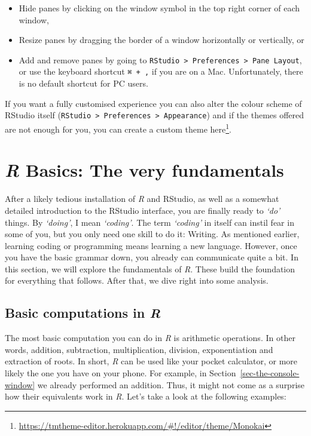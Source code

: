 \documentclass[
  letterpaper,
]{krantz}
\renewcommand{\href}[2]{#2\footnote{\url{#1}}}
\begin{document}
\begin{itemize}
\item
  Hide panes by clicking on the window symbol in the top right corner of
  each window,
\item
  Resize panes by dragging the border of a window horizontally or
  vertically, or
\item
  Add and remove panes by going to
  \texttt{RStudio\ \textgreater{}\ Preferences\ \textgreater{}\ Pane\ Layout},
  or use the keyboard shortcut \texttt{⌘\ +\ ,} if you are on a Mac.
  Unfortunately, there is no default shortcut for PC users.
\end{itemize}

If you want a fully customised experience you can also alter the colour
scheme of RStudio itself
(\texttt{RStudio\ \textgreater{}\ Preferences\ \textgreater{}\ Appearance})
and if the themes offered are not enough for you, you can create a
custom theme
\href{https://tmtheme-editor.herokuapp.com/\#!/editor/theme/Monokai}{here}.


\chapter{\texorpdfstring{\emph{R} Basics: The very
fundamentals}{R Basics: The very fundamentals}}\label{sec-r-basics-the-very-fundamentals}

After a likely tedious installation of \emph{R} and RStudio, as well as
a somewhat detailed introduction to the RStudio interface, you are
finally ready to \emph{`do'} things. By \emph{`doing'}, I mean
\emph{`coding'}. The term \emph{`coding'} in itself can instil fear in
some of you, but you only need one skill to do it: Writing. As mentioned
earlier, learning coding or programming means learning a new language.
However, once you have the basic grammar down, you already can
communicate quite a bit. In this section, we will explore the
fundamentals of \emph{R}. These build the foundation for everything that
follows. After that, we dive right into some analysis.

\section{\texorpdfstring{Basic computations in
\emph{R}}{Basic computations in R}}\label{sec-basic-computations-in-r}

The most basic computation you can do in \emph{R} is arithmetic
operations. In other words, addition, subtraction, multiplication,
division, exponentiation and extraction of roots. In short, \emph{R} can
be used like your pocket calculator, or more likely the one you have on
your phone. For example, in Section~\ref{sec-the-console-window} we
already performed an addition. Thus, it might not come as a surprise how
their equivalents work in \emph{R}. Let's take a look at the following
examples:
\end{document}
